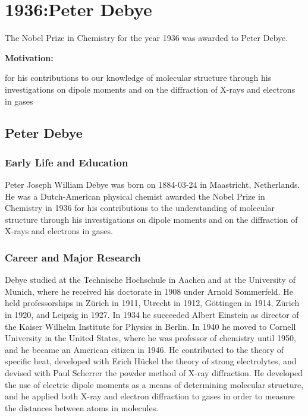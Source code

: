 \chapter{1936:Peter Debye}

\label{chap:chemistry1936}

The Nobel Prize in Chemistry for the year 1936 was awarded to Peter Debye.

\textbf{Motivation:}

for his contributions to our knowledge of molecular structure through his investigations on dipole moments and on the diffraction of X-rays and electrons in gases

\section{Peter Debye}

\subsection*{Early Life and Education}

Peter Joseph William Debye was born on 1884-03-24 in Maastricht, Netherlands.
He was a Dutch-American physical chemist awarded the Nobel Prize in Chemistry in 1936 for his contributions to the understanding of molecular structure through his investigations on dipole moments and on the diffraction of X-rays and electrons in gases.

\subsection*{Career and Major Research}

Debye studied at the Technische Hochschule in Aachen and at the University of Munich, where he received his doctorate in 1908 under Arnold Sommerfeld.
He held professorships in Zürich in 1911, Utrecht in 1912, Göttingen in 1914, Zürich in 1920, and Leipzig in 1927.
In 1934 he succeeded Albert Einstein as director of the Kaiser Wilhelm Institute for Physics in Berlin.
In 1940 he moved to Cornell University in the United States, where he was professor of chemistry until 1950, and he became an American citizen in 1946.
He contributed to the theory of specific heat, developed with Erich Hückel the theory of strong electrolytes, and devised with Paul Scherrer the powder method of X-ray diffraction.
He developed the use of electric dipole moments as a means of determining molecular structure, and he applied both X-ray and electron diffraction to gases in order to measure the distances between atoms in molecules.

